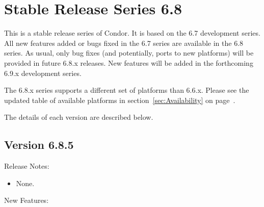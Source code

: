 
\section{\label{sec:History-6-8}Stable Release Series 6.8}

This is a stable release series of Condor.
It is based on the 6.7 development series.
All new features added or bugs fixed in the 6.7 series are available
in the 6.8 series.
As usual, only bug fixes (and potentially, ports to new platforms)
will be provided in future 6.8.x releases.
New features will be added in the forthcoming 6.9.x development series.


The 6.8.x series supports a different set of platforms than 6.6.x.
Please see the updated table of available platforms in
section~\ref{sec:Availability} on page~\pageref{sec:Availability}.

The details of each version are described below.

\subsection*{\label{sec:New-6-8-5}Version 6.8.5}

\noindent Release Notes:

\begin{itemize}

\item None.

\end{itemize}


\noindent New Features:

